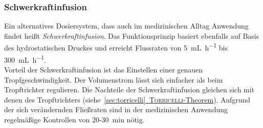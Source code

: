 \subsubsection*{Schwerkraftinfusion}
Ein alternatives Dosiersystem, dass auch im medizinischen Alltag Anwendung findet heißt \textit{Schwerkraftinfusion}. Das Funktionsprinzip basiert ebenfalls auf Basis des hydrostatischen Druckes und erreicht Flussraten von \SI{5}{\milli \liter \per \hour} bis \SI{300}{\milli \liter \per \hour}. \cite{pfm_medical}\\
Vorteil der Schwerkraftinfusion ist das Einstellen einer genauen Tropfgeschwindigkeit. Der Volumenstrom lässt sich einfacher als beim Tropftrichter regulieren. Die Nachteile der Schwerkraftinfusion gleichen sich mit denen des Tropftrichters \mbox{(siehe \hyperref[sec:torricelli]{\ref{sec:torricelli} \textsc{Torricelli}-Theorem})}. Aufgrund der sich verändernden Fließraten sind in der medizinischen Anwendung regelmäßige Kontrollen von 20-\SI{30}{\minute} nötig.\cite{OnlinePortalfurprofessionellPflegende.06.03.2017}


